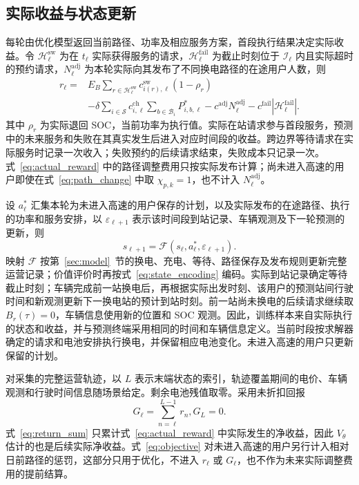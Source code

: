\subsection{实际收益与状态更新}
\label{sec:reward}
每轮由优化模型返回当前路径、功率及相应服务方案，首段执行结果决定实际收益。令 $\mathcal H_\ell^{\mathrm{sw}}$ 为在 $t_\ell$ 实际获得服务的请求，$\mathcal H_\ell^{\mathrm{fail}}$ 为截止时刻位于 $\mathcal I_\ell$ 内且实际超时的预约请求，$N_\ell^{\mathrm{adj}}$ 为本轮实际向其发布了不同换电路径的在途用户人数，则
\begin{equation}
\begin{aligned}
r_\ell={}&E_B\sum_{r\in\mathcal H_\ell^{\mathrm{sw}}}
c_{i(r),\ell}^{\mathrm{sw}}(1-\rho_r)\\
&-\delta\sum_{i\in\mathcal S}c_{i,\ell}^{\mathrm{ch}}
\sum_{b\in\mathcal B_i}P_{i,b,\ell}^{*}
-c^{\mathrm{adj}}N_\ell^{\mathrm{adj}}
-c^{\mathrm{fail}}|\mathcal H_\ell^{\mathrm{fail}}|.
\end{aligned}
\label{eq:actual_reward}
\end{equation}
其中 $\rho_r$ 为实际退回 SOC，当前功率为执行值。实际在站请求参与首段服务，预测中的未来服务和失败在其真实发生后进入对应时间段的收益。跨边界等待请求在实际服务时记录一次收入；失败预约的后续请求结束，失败成本只记录一次。式~\eqref{eq:actual_reward} 中的路径调整费用只按实际发布计算；尚未进入高速的用户即使在式~\eqref{eq:path_change} 中取 $\chi_{p,k}=1$，也不计入 $N_\ell^{\mathrm{adj}}$。

设 $a_\ell^*$ 汇集本轮为未进入高速的用户保存的计划，以及实际发布的在途路径、执行的功率和服务安排，以 $\varepsilon_{\ell+1}$ 表示该时间段到站记录、车辆观测及下一轮预测的更新，则
\begin{equation}
s_{\ell+1}=\mathcal F(s_\ell,a_\ell^*,\varepsilon_{\ell+1}).
\label{eq:state_transition}
\end{equation}
映射 $\mathcal F$ 按第~\ref{sec:model}~节的换电、充电、等待、路径保存及发布规则更新完整运营记录；价值评价时再按式~\eqref{eq:state_encoding} 编码。实际到站记录确定等待截止时刻；车辆完成前一站换电后，再根据实际出发时刻、该用户的预测站间行驶时间和新观测更新下一换电站的预计到站时刻。前一站尚未换电的后续请求继续取 $B_r(\tau)=0$，车辆信息使用新的位置和 SOC 观测。因此，训练样本来自实际执行的状态和收益，并与预测终端采用相同的时间和车辆信息定义。当前时段按求解器确定的请求和电池安排执行换电，并保留相应电池变化。未进入高速的用户只更新保留的计划。

对采集的完整运营轨迹，以 $L$ 表示末端状态的索引，轨迹覆盖期间的电价、车辆观测和行驶时间信息随场景给定。剩余电池残值取零。采用未折扣回报
\begin{subequations}\label{eq:return_target}
\begin{equation}
G_\ell=\sum_{n=\ell}^{L-1}r_n,
\label{eq:return_sum}
\end{equation}
\begin{equation}
G_L=0.
\label{eq:return_terminal}
\end{equation}
\end{subequations}
式~\eqref{eq:return_sum} 只累计式~\eqref{eq:actual_reward} 中实际发生的净收益，因此 $V_\theta$ 估计的也是后续实际净收益。式~\eqref{eq:objective} 对未进入高速的用户另行计入相对日前路径的惩罚，这部分只用于优化，不进入 $r_\ell$ 或 $G_\ell$，也不作为未来实际调整费用的提前结算。

